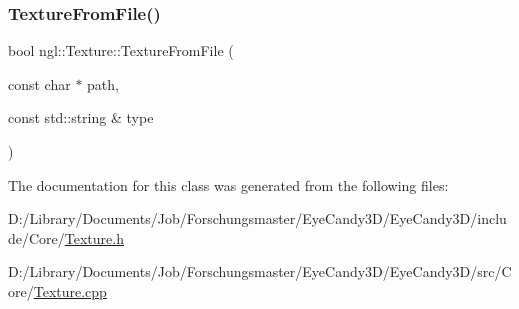 \mbox{\label{classngl_1_1_texture_a5e836876dc5b8ab6dcf7468d492ca05b}} 
\subsubsection{\texorpdfstring{Texture\+From\+File()}{TextureFromFile()}}
{\footnotesize\ttfamily bool ngl\+::\+Texture\+::\+Texture\+From\+File (\begin{DoxyParamCaption}\item[{const char $\ast$}]{path,  }\item[{const std\+::string \&}]{type }\end{DoxyParamCaption})}



The documentation for this class was generated from the following files\+:\begin{DoxyCompactItemize}
\item 
D\+:/\+Library/\+Documents/\+Job/\+Forschungsmaster/\+Eye\+Candy3\+D/\+Eye\+Candy3\+D/include/\+Core/\mbox{\hyperlink{_texture_8h}{Texture.\+h}}\item 
D\+:/\+Library/\+Documents/\+Job/\+Forschungsmaster/\+Eye\+Candy3\+D/\+Eye\+Candy3\+D/src/\+Core/\mbox{\hyperlink{_texture_8cpp}{Texture.\+cpp}}\end{DoxyCompactItemize}
